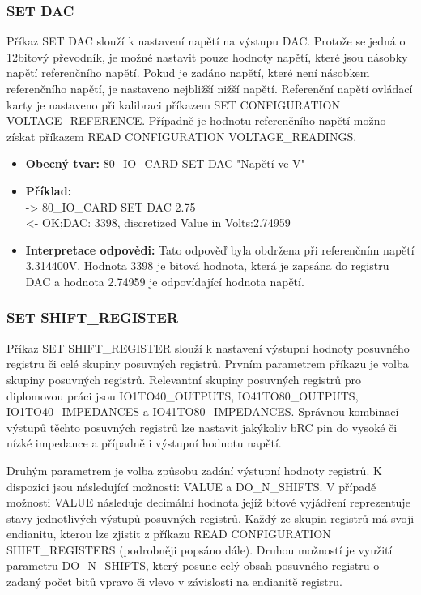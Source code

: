 \subsubsection{SET DAC}
Příkaz SET DAC slouží k nastavení napětí na výstupu DAC. Protože se jedná o 12bitový převodník, je možné nastavit pouze hodnoty napětí, které jsou násobky
napětí referenčního napětí. Pokud je zadáno napětí, které není násobkem referenčního napětí, je nastaveno nejbližší nižší napětí.
Referenční napětí ovládací karty je nastaveno při kalibraci příkazem SET CONFIGURATION VOLTAGE\_REFERENCE.
Případně je hodnotu referenčního napětí možno získat
příkazem READ CONFIGURATION VOLTAGE\_READINGS.
\begin{itemize}[leftmargin=*]
    \item \textbf{Obecný tvar:} 80\_IO\_CARD SET DAC "Napětí ve V"
    \item \textbf{Příklad:}\\
    -> 80\_IO\_CARD SET DAC 2.75\\
    <- OK;DAC: 3398, discretized Value in Volts:2.74959
    \item \textbf{Interpretace odpovědi:} Tato odpověď byla obdržena při referenčním napětí 3.314400V.
    Hodnota 3398 je bitová hodnota, která je zapsána do registru DAC a
    hodnota 2.74959 je odpovídající hodnota napětí.
\end{itemize}

\subsubsection{SET SHIFT\_REGISTER}
Příkaz SET SHIFT\_REGISTER slouží k nastavení výstupní hodnoty posuvného registru či celé skupiny posuvných registrů.
Prvním parametrem příkazu je volba skupiny posuvných registrů.
Relevantní skupiny posuvných registrů pro diplomovou práci jsou IO1TO40\_OUTPUTS, IO41TO80\_OUTPUTS, IO1TO40\_IMPEDANCES a IO41TO80\_IMPEDANCES.
Správnou kombinací výstupů těchto posuvných registrů lze nastavit jakýkoliv bRC pin do vysoké či nízké impedance a případně i výstupní hodnotu napětí.\par

Druhým parametrem je volba způsobu zadání výstupní hodnoty registrů. K dispozici jsou následující možnosti: VALUE a DO\_N\_SHIFTS.
V případě možnosti VALUE následuje decimální hodnota jejíž bitové vyjádření reprezentuje stavy jednotlivých výstupů posuvných registrů.
Každý ze skupin registrů má svoji endianitu, kterou lze zjistit z příkazu READ CONFIGURATION SHIFT\_REGISTERS (podrobněji popsáno dále). 
Druhou možností je využití parametru DO\_N\_SHIFTS,
který posune celý obsah posuvného registru o zadaný počet bitů vpravo či vlevo v závislosti na endianitě registru.

